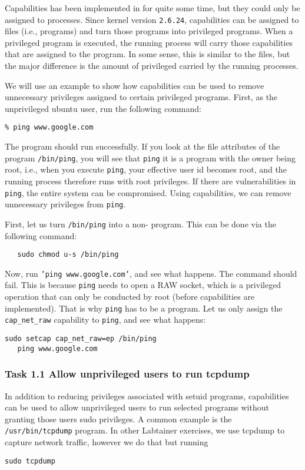 Capabilities has been implemented in \linux for quite some time,
but they could only be assigned to processes.
Since kernel version {\tt 2.6.24}, capabilities can be assigned to
files (i.e., programs) and turn those programs into privileged programs.
When a privileged program is executed, the running process will carry
those capabilities that are assigned to the program. In some sense,
this is similar to the \setuid files, but the major difference is the
amount of privileged carried by the running processes.

We will use an example to show how capabilities can be used to
remove unnecessary privileges assigned to certain privileged programs.
First, as the unprivileged ubuntu user, run the following command:
\begin{verbatim}
% ping www.google.com
\end{verbatim}

The program should run successfully. If you look at the file attributes
of the program {\tt /bin/ping}, you will see that {\tt ping}
it is a \setuid program with the owner being root, i.e., when you
execute {\tt ping}, your effective user id becomes root, and the running
process therefore runs with root privileges. If there are vulnerabilities in {\tt ping},
the entire system can be compromised. Using capabilities, we can
remove unnecessary privileges from {\tt ping}.

First, let us turn {\tt /bin/ping} into a non-\setuid
program. This can be done via the following command:
\begin{verbatim}
   sudo chmod u-s /bin/ping
\end{verbatim}

Now, run {\tt 'ping www.google.com'}, and see what happens.
The command should fail. This is because {\tt ping} needs
to open a RAW socket, which is a privileged operation that can only be
conducted by root (before capabilities are implemented). That is why
{\tt ping} has to be a \setuid program. Let us only assign the {\tt cap\_net\_raw}
capability to {\tt ping}, and see what happens:

\begin{Verbatim}[frame=single] 
   sudo setcap cap_net_raw=ep /bin/ping
   ping www.google.com
\end{Verbatim}

\subsubsection{Task 1.1 Allow unprivileged users to run tcpdump}
In addition to reducing privileges associated with setuid programs,
capabilities can be used to allow unprivileged users to run
selected programs without granting those users sudo privileges.
A common example is the \texttt{/usr/bin/tcpdump} program.  In
other Labtainer exercises, we use tcpdump to capture network
traffic, however we do that but running
\begin{Verbatim}[frame=single] 
   sudo tcpdump
\end{Verbatim}

